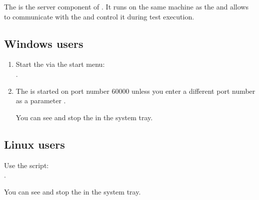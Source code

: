 % 
%
%

\label{otherportnumber}
The \gdagent{} is the server component of \jb{}. It runs on the same machine as the \gdaut{} and allows \jb{} to communicate with the \gdaut{} and control it during test execution. 

\subsection{Windows users}
\begin{enumerate}
\item Start the \gdagent{} via the start menu:\\
. 
\item The  \gdagent{} is started on port number 60000 unless you enter a different port number as a parameter . 



You can see and stop the \gdagent{} in the system tray.  

\end{enumerate}

\subsection{Linux users}

Use the script:\\
 . 

You can see and stop the \gdagent{} in the system tray. 

